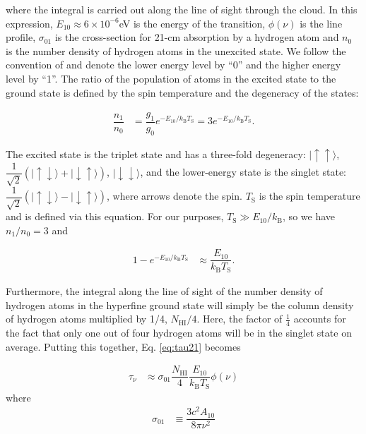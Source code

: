 where the integral is carried out along the line of sight through the cloud. In this expression, $E_{10} \approx 6\times 10^{-6}$eV is the energy of the transition, $\phi(\nu)$ is the line profile, $\sigma_{01}$ is the cross-section for 21-cm absorption by a hydrogen atom and $n_{0}$ is the number density of hydrogen atoms in the unexcited state. We follow the convention of \citet{Furlanetto2006} and denote the lower energy level by ``0'' and the higher energy level by ``1''. The ratio of the population of atoms in the excited state to the ground state is defined by the spin temperature and the degeneracy of the states:

\begin{align}
\dfrac{n_{1}}{n_{0}} &= \dfrac{g_1}{g_0}e^{-E_{10}/k_{\text{B}}T_{\text{S}}} = 3 e^{-E_{10}/k_{\text{B}}T_{\text{S}}}.
\end{align}

The excited state is the triplet state and has a three-fold degeneracy: $|\uparrow \uparrow \rangle$, $\dfrac{1}{\sqrt{2}}(|\uparrow \downarrow\rangle + |\downarrow \uparrow \rangle)$, $|\downarrow \downarrow\rangle$, and the lower-energy state is the singlet state: $\dfrac{1}{\sqrt{2}}( |\uparrow \downarrow\rangle - |\downarrow \uparrow \rangle)$, where arrows denote the spin. $T_{\text{S}}$ is the spin temperature and is defined via this equation. For our purposes, $T_{\text{S}} \gg E_{10}/k_{\text{B}}$, so we have $n_{1}/n_{0} = 3$ and

\begin{align}
1 - e^{-E_{10}/k_{\text{B}}T_{\text{S}}} &\approx \dfrac{E_{10}}{k_{\text{B}}T_{\text{S}}}.
\end{align}


 Furthermore, the integral along the line of sight of the number density of hydrogen atoms in the hyperfine ground state will simply be the column density of hydrogen atoms multiplied by 1/4, $N_{\text{HI}}/4$. Here, the factor of $\frac14$ accounts for the fact that only one out of four hydrogen atoms will be in the singlet state on average. Putting this together, Eq. \ref{eq:tau21} becomes
 
\begin{align}
\tau_{\nu} &\approx \sigma_{01} \dfrac{N_{\text{HI}}}{4} \dfrac{E_{\text{10}}}{k_{\text{B}}T_{\text{S}}} \phi(\nu)
\end{align}
where 
\begin{align}
\sigma_{01} &\equiv \dfrac{3c^2 A_{10}}{8\pi\nu^{2}}
\end{align}

